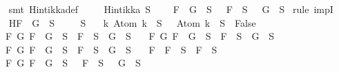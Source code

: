 \begin{isabellebody}
%
\isadelimproof
\ \ %
\endisadelimproof
%
\isatagproof
{}\isamarkupfalse%
\ {\isacharparenleft}smt\ Hintikka{\isacharunderscore}def{\isacharparenright}%
\endisatagproof
{\isafoldproof}%
%
\isadelimproof
\isanewline
%
\endisadelimproof
\isanewline
{}\isamarkupfalse%
\ \isanewline
\ \ \ {\isachardoublequoteopen}Hintikka\ S{\isachardoublequoteclose}\ \isanewline
\ \ \ {\isachardoublequoteopen}\isactrlbold {\isasymnot}{\isacharparenleft}F\ \isactrlbold {\isasymand}\ G{\isacharparenright}\ {\isasymin}\ S\ {\isasymlongrightarrow}\ \isactrlbold {\isasymnot}\ F\ {\isasymin}\ S\ {\isasymor}\ \isactrlbold {\isasymnot}\ G\ {\isasymin}\ S{\isachardoublequoteclose}\isanewline
%
\isadelimproof
%
\endisadelimproof
%
\isatagproof
{}\isamarkupfalse%
\ {\isacharparenleft}rule\ impI{\isacharparenright}\isanewline
\ \ \isamarkupfalse%
\ H{\isacharcolon}{\isachardoublequoteopen}\isactrlbold {\isasymnot}{\isacharparenleft}F\ \isactrlbold {\isasymand}\ G{\isacharparenright}\ {\isasymin}\ S{\isachardoublequoteclose}\isanewline
\ \isamarkupfalse%
\ {\isachardoublequoteopen}{\isasymbottom}\ {\isasymnotin}\ S\isanewline
\ \ {\isasymand}\ {\isacharparenleft}{\isasymforall}k{\isachardot}\ Atom\ k\ {\isasymin}\ S\ {\isasymlongrightarrow}\ \isactrlbold {\isasymnot}\ {\isacharparenleft}Atom\ k{\isacharparenright}\ {\isasymin}\ S\ {\isasymlongrightarrow}\ False{\isacharparenright}\isanewline
\ \ {\isasymand}\ {\isacharparenleft}{\isasymforall}F\ G{\isachardot}\ F\ \isactrlbold {\isasymand}\ G\ {\isasymin}\ S\ {\isasymlongrightarrow}\ F\ {\isasymin}\ S\ {\isasymand}\ G\ {\isasymin}\ S{\isacharparenright}\isanewline
\ \ {\isasymand}\ {\isacharparenleft}{\isasymforall}F\ G{\isachardot}\ F\ \isactrlbold {\isasymor}\ G\ {\isasymin}\ S\ {\isasymlongrightarrow}\ F\ {\isasymin}\ S\ {\isasymor}\ G\ {\isasymin}\ S{\isacharparenright}\isanewline
\ \ {\isasymand}\ {\isacharparenleft}{\isasymforall}F\ G{\isachardot}\ F\ \isactrlbold {\isasymrightarrow}\ G\ {\isasymin}\ S\ {\isasymlongrightarrow}\ \isactrlbold {\isasymnot}F\ {\isasymin}\ S\ {\isasymor}\ G\ {\isasymin}\ S{\isacharparenright}\isanewline
\ \ {\isasymand}\ {\isacharparenleft}{\isasymforall}F{\isachardot}\ \isactrlbold {\isasymnot}\ {\isacharparenleft}\isactrlbold {\isasymnot}F{\isacharparenright}\ {\isasymin}\ S\ {\isasymlongrightarrow}\ F\ {\isasymin}\ S{\isacharparenright}\isanewline
\ \ {\isasymand}\ {\isacharparenleft}{\isasymforall}F\ G{\isachardot}\ \isactrlbold {\isasymnot}{\isacharparenleft}F\ \isactrlbold {\isasymand}\ G{\isacharparenright}\ {\isasymin}\ S\ {\isasymlongrightarrow}\ \isactrlbold {\isasymnot}\ F\ {\isasymin}\ S\ {\isasymor}\ \isactrlbold {\isasymnot}\ G\ {\isasymin}\ S{\isacharparenright}\isanewline

\end{isabellebody}
